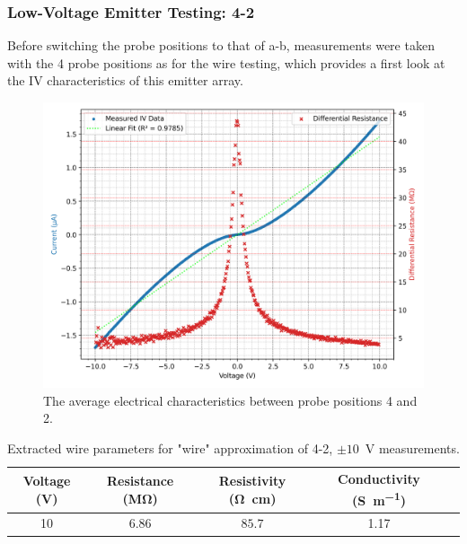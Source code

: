 \begin{refsection}
\subsubsection{Low-Voltage Emitter Testing: 4-2}
Before switching the probe positions to that of a-b, measurements were taken with the 4 probe positions as for the wire testing, which provides a first look at the IV characteristics of this emitter array.
\begin{figure}[H]
    \centering
    \includegraphics[width=\linewidth]{Chapter7/Figs/Raster/Emitters/42 3x 10V.png}
    \caption{The average electrical characteristics between probe positions 4 and 2.}
    \label{fig:e_42_10v}
\end{figure}

\begin{table}[h!]
\centering
\begin{tabular}{|c|c|c|c|c|}
\hline
\textbf{Voltage (V)} & \textbf{Resistance (\si{\mega\ohm})}  & \textbf{Resistivity (\si{\ohm\centi\metre})} & \textbf{Conductivity (\si{\siemens\per\metre})} \\
\hline
10 & $6.86$ & $85.7$ & 1.17 \\
\hline
\end{tabular}
\caption{Extracted wire parameters for "wire" approximation of 4-2, $\pm10$~\si{\volt} measurements.}
\label{tab:42_e_wire_parameters_10v}
\end{table}


\end{refsection}
